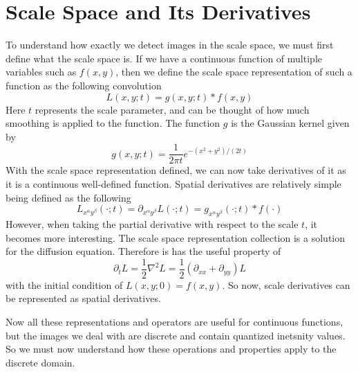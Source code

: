 \documentclass{article}
\begin{document}
\section{Scale Space and Its Derivatives}
To understand how exactly we detect images in the scale space, we must first define what the scale space is.
If we have a continuous function of multiple variables such as $f(x,y)$, then we define the scale space representation of such a function as the following convolution
\begin{equation}
  L(x,y;t) = g(x,y;t) * f(x,y)
\end{equation}
Here $t$ represents the scale parameter, and can be thought of how much smoothing is applied to the function. The function $g$ is the Gaussian kernel given by
\begin{equation}
  g(x,y;t) = \frac{1}{2 \pi t}e^{-(x^2+y^2)/(2t)}
\end{equation}
With the scale space representation defined, we can now take derivatives of it as it is a continuous well-defined function.
Spatial derivatives are relatively simple being defined as the following
\begin{equation}
  L_{x^{\alpha}y^{\beta}}(\cdot;t) = \partial_{x^{\alpha}y^{\beta}}L(\cdot;t) = g_{x^{\alpha}y^{\beta}}(\cdot;t) * f(\cdot)
\end{equation}
However, when taking the partial derivative with respect to the scale $t$, it becomes more interesting.
The scale space representation collection is a solution for the diffusion equation. Therefore is has the useful property of \cite{Lindeberg1993}
\begin{equation}
  \partial_t L = \frac{1}{2} \nabla^2 L = \frac{1}{2} (\partial_{xx} + \partial_{yy})L
\end{equation}
with the initial condition of $L(x,y;0) = f(x,y)$.
So now, scale derivatives can be represented as spatial derivatives. 

Now all these representations and operators are useful for continuous functions, but the images we deal with are discrete and contain quantized inetsnity values.
So we must now understand how these operations and properties apply to the discrete domain.
\end{document}
